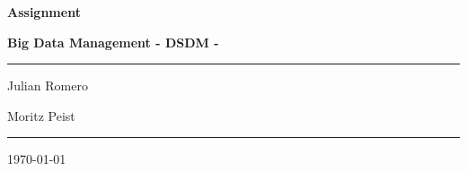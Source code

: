 \documentclass[12pt]{article}
\begin{document}
\begin{titlepage}
	\centering
	\par\vspace{0.75cm}
	{\huge\bfseries Assignment~\nass\par}
    {\large\bfseries Big Data Management - DSDM -~\gr\par}
	\vspace{0.25cm}
    \noindent\rule{\textwidth}{1pt}
    {\Large Julian Romero\par}
	{\Large Moritz Peist\par}
    \noindent\rule{\textwidth}{1pt}
	\vfill
    \tableofcontents
    \vfill
	{\large \today\par}
\end{titlepage}





\newpage

\end{document}
